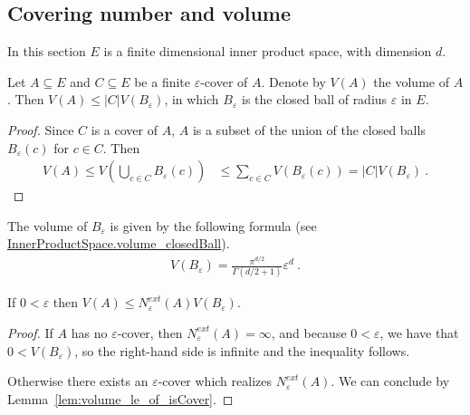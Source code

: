 \subsection{Covering number and volume}

In this section $E$ is a finite dimensional inner product space, with dimension $d$.

\begin{lemma}\label{lem:volume_le_of_isCover}
  \leanok
Let $A \subseteq E$ and $C \subseteq E$ be a finite $\varepsilon$-cover of $A$. Denote by $V(A)$ the volume of $A$.
Then $V(A) \le \vert C \vert V(B_\varepsilon)$, in which $B_\varepsilon$ is the closed ball of radius $\varepsilon$ in $E$.
\end{lemma}

\begin{proof}\leanok
Since $C$ is a cover of $A$, $A$ is a subset of the union of the closed balls $B_\varepsilon(c)$ for $c \in C$. Then
\begin{align*}
  V(A) \le V(\bigcup_{c \in C} B_\varepsilon(c))
  &\le \sum_{c \in C} V(B_\varepsilon(c))
  = \vert C \vert V(B_\varepsilon)
  \: .
\end{align*}
\end{proof}

The volume of $B_\varepsilon$ is given by the following formula (see \href{https://leanprover-community.github.io/mathlib4_docs/Mathlib/MeasureTheory/Measure/Lebesgue/VolumeOfBalls.html#InnerProductSpace.volume_closedBall}{InnerProductSpace.volume\_closedBall}).
\begin{align*}
  V(B_\varepsilon) = \frac{\pi^{d/2}}{\Gamma(d/2 + 1)} \varepsilon^d
  \: .
\end{align*}


\begin{lemma}\label{lem:volume_le_externalCoveringNumber_mul}
  \leanok
If $0 < \varepsilon$ then $V(A) \le N^{ext}_\varepsilon(A) V(B_\varepsilon)$.
\end{lemma}

\begin{proof}\leanok
If $A$ has no $\varepsilon$-cover, then $N^{ext}_\varepsilon(A) = \infty$, and because $0 < \varepsilon$, we have that $0 < V(B_\varepsilon)$, so the right-hand side is infinite and the inequality follows.

Otherwise there exists an $\varepsilon$-cover which realizes $N^{ext}_\varepsilon(A)$. We can conclude by Lemma~\ref{lem:volume_le_of_isCover}.
\end{proof}


